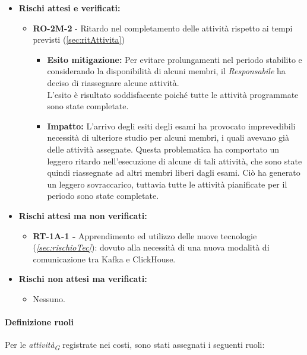 \begin{itemize}
    \item \textbf{Rischi attesi e verificati:}
\begin{itemize}
    \item \textbf{RO-2M-2} - Ritardo nel completamento delle attività rispetto ai tempi previsti (\ref{sec:ritAttivita})
    \begin{itemize}
        \item \textbf{Esito mitigazione:} 
        Per evitare prolungamenti nel periodo stabilito e considerando la disponibilità di alcuni membri, il \textit{Responsabile} ha deciso di riassegnare alcune attività. \\
        L'esito è risultato soddisfacente poiché tutte le attività programmate sono state completate.
        \item \textbf{Impatto:}
        L'arrivo degli esiti degli esami ha provocato imprevedibili necessità di ulteriore studio per alcuni membri, i quali avevano già delle attività assegnate. Questa problematica ha comportato un leggero ritardo nell'esecuzione di alcune di tali attività, che sono state quindi riassegnate ad altri membri liberi dagli esami. Ciò ha generato un leggero sovraccarico, tuttavia tutte le attività pianificate per il periodo sono state completate.
    \end{itemize}
\end{itemize}
\item \textbf{Rischi attesi ma non verificati:}
 \begin{itemize}
    \item  \textbf{RT-1A-1 -} Apprendimento ed utilizzo delle nuove tecnologie (\textit{\ref{sec:rischioTec}}): dovuto alla necessità di una nuova modalità di comunicazione tra Kafka e ClickHouse.
\end{itemize}
\item \textbf{Rischi non attesi ma verificati:}
\begin{itemize}
    \item Nessuno.
\end{itemize}
\end{itemize}

\paragraph{Definizione ruoli}
Per le \textit{attività}\textsubscript{\textit{G}} registrate nei costi, sono stati assegnati i seguenti ruoli: 

\vspace{0.4cm}

